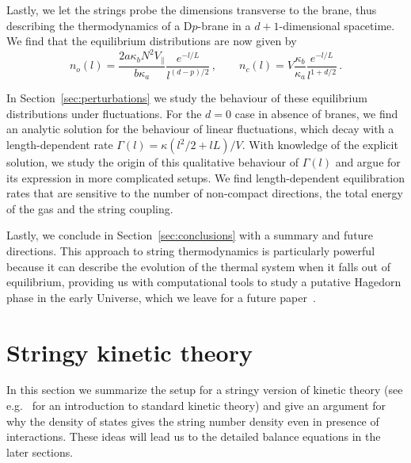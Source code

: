 \documentclass[a4paper,11pt]{article}
\begin{document}
Lastly, we let the strings probe the dimensions transverse to the brane, thus describing the thermodynamics of a D$p$-brane in a $d+1$-dimensional spacetime.
We find that the equilibrium distributions are now given by
\begin{equation}
     n_o(l)=\frac{2a \kappa_bN^2V_\parallel}{b \kappa_a}\frac{e^{-l/L}}{l^{(d-p)/2}} \, , \qquad 
     n_c(l) = V \frac{\kappa_b}{\kappa_a}\frac{e^{-l/L}}{l^{1+d/2}} \, .
\end{equation}

In Section~\ref{sec:perturbations} we study the behaviour of these equilibrium distributions under fluctuations.
For the $d=0$ case in absence of branes, we find an analytic solution for the behaviour of linear fluctuations, which decay with a length-dependent rate $\Gamma(l)=\kappa (l^2/2+l L)/V$.
With knowledge of the explicit solution, we study the origin of this qualitative behaviour of $\Gamma (l)$ and argue for its expression in more complicated setups.
We find length-dependent equilibration rates that are sensitive to the number of non-compact directions, the total energy of the gas and the string coupling.

Lastly, we conclude in Section~\ref{sec:conclusions} with a summary and future directions.
This approach to string thermodynamics is particularly powerful because it can describe the evolution of the thermal system when it falls out of equilibrium, providing us with computational tools to study a putative Hagedorn phase in the early Universe,
which we leave for a future paper~\cite{Frey:2024in}.




\section{Stringy kinetic theory}\label{sec:general-argument}

In this section we summarize the setup for a stringy version of kinetic theory (see e.g.~\cite{Tong:notes} for an introduction to standard kinetic theory) and give an argument for why the density of states gives the string number density even in presence of interactions. These ideas will lead us to the detailed balance equations in the later sections.
\end{document}
